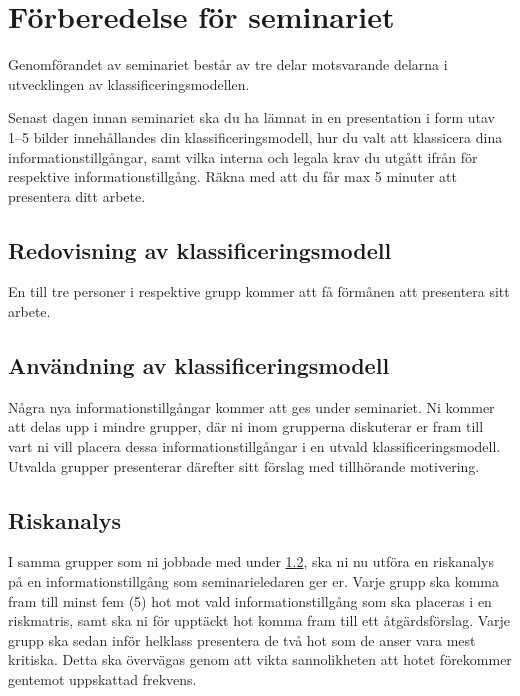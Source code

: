 \documentclass[a4paper]{llncs}
\begin{document}
\section{Förberedelse för seminariet}

Genomförandet av seminariet består av tre delar motsvarande delarna 
i utvecklingen av klassificeringsmodellen.

Senast dagen innan seminariet ska du ha lämnat in en presentation i
form utav 1--5 bilder innehållandes din klassificeringsmodell, hur du valt
att klassicera dina informationstillgångar, samt vilka interna och legala krav
du utgått ifrån för respektive informationstillgång. Räkna med att du får max 5
minuter att presentera ditt arbete.

\subsection{Redovisning av klassificeringsmodell}
\label{sec:present}

En till tre personer i respektive grupp kommer att få förmånen att presentera 
sitt arbete.

\subsection{Användning av klassificeringsmodell}
\label{sec:use}

Några nya informationstillgångar kommer att ges under seminariet.
Ni kommer att delas upp i mindre grupper, där ni inom grupperna diskuterar er 
fram till vart ni vill placera dessa informationstillgångar i en utvald 
klassificeringsmodell.
Utvalda grupper presenterar därefter sitt förslag med tillhörande motivering.

\subsection{Riskanalys}
\label{sec:risk}

I samma grupper som ni jobbade med under \cref{sec:use}, ska ni nu utföra en 
riskanalys på en informationstillgång som seminarieledaren ger er.
Varje grupp ska komma fram till minst fem (5) hot mot vald 
informationstillgång som ska placeras i en riskmatris, samt ska ni för upptäckt
hot komma fram till ett åtgärdsförslag. Varje grupp ska sedan inför helklass presentera
de två hot som de anser vara mest kritiska. Detta ska övervägas genom att vikta sannolikheten
att hotet förekommer gentemot uppskattad frekvens.
\end{document}

